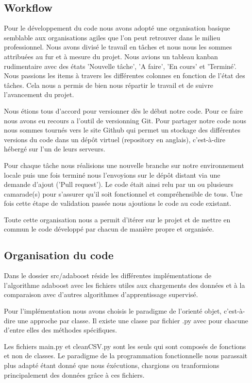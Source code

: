\documentclass{article}
\begin{document}
\subsection{Workflow}

Pour le développement du code nous avons adopté une organisation basique semblable aux organisations agiles que l'on peut retrouver dans le milieu professionnel. 
Nous avons divisé le travail en tâches et nous nous les sommes attribuées au fur et à mesure du projet. Nous avions un tableau kanban rudimentaire avec des états 'Nouvelle tâche', 'A faire', 'En cours' et 'Terminé'. Nous passions les items à travers les différentes colonnes en fonction de l'état des tâches. Cela nous a permis de bien nous répartir le travail et de suivre l'avancement du projet. 

Nous étions tous d'accord pour versionner dès le début notre code. Pour ce faire nous avons eu recours a l'outil de versionning Git. 
Pour partager notre code nous nous sommes tournés vers le site Github qui permet un stockage des différentes versions du code dans un dépôt virtuel (repository en anglais), c'est-à-dire hébergé sur l'un de leurs serveurs.

Pour chaque tâche nous réalisions une nouvelle branche sur notre environnement locale puis une fois terminé nous l'envoyions sur le dépôt distant via une demande d'ajout ('Pull request'). 
Le code était ainsi relu par un ou plusieurs camarade(s) pour s'assurer qu'il soit fonctionnel et compréhensible de tous. Une fois cette étape de validation passée nous ajoutions le code au code existant. 

Toute cette organisation nous a permit d'itérer sur le projet et de mettre en commun le code développé par chacun de manière propre et organisée. 

\subsection{Organisation du code}

Dans le dossier src/adaboost réside les différentes implémentations de l'algorithme adaboost avec les fichiers utiles aux chargements des données et à la comparaison avec d'autres algorithmes d'apprentissage supervisé.

Pour l'implémentation nous avons choisis le paradigme de l'orienté objet, c'est-à-dire une approche par classe. Il existe une classe par fichier .py avec pour chacune d'entre elles des méthodes spécifiques. 

Les fichiers main.py et cleanCSV.py sont les seuls qui sont composés de fonctions et non de classes. Le paradigme de la programmation fonctionnelle nous parassait plus adapté étant donné que nous éxécutions, chargions ou tranformions principalement des données grâce à ces fichiers.  
\end{document}
